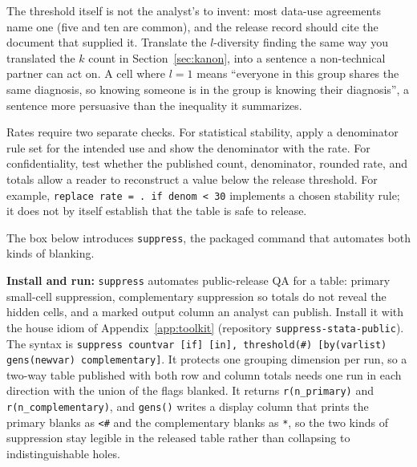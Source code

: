 The threshold itself is not the analyst's to invent: most data-use agreements name one (five and ten are common), and the release record should cite the document that supplied it. Translate the $l$-diversity finding the same way you translated the $k$ count in Section~\ref{sec:kanon}, into a sentence a non-technical partner can act on. A cell where $l=1$ means \enquote{everyone in this group shares the same diagnosis, so knowing someone is in the group is knowing their diagnosis}, a sentence more persuasive than the inequality it summarizes.

Rates require two separate checks. For statistical stability, apply a denominator rule set for the intended use and show the denominator with the rate. For confidentiality, test whether the published count, denominator, rounded rate, and totals allow a reader to reconstruct a value below the release threshold. For example, \texttt{replace rate = . if denom < 30} implements a chosen stability rule; it does not by itself establish that the table is safe to release.

The box below introduces \texttt{suppress}, the packaged command that automates both kinds of blanking.

\begin{kaobox}[frametitle=Package Integration: \texttt{suppress}]
\textbf{Install and run:} \texttt{suppress} automates public-release QA for a table: primary small-cell suppression, complementary suppression so totals do not reveal the hidden cells, and a marked output column an analyst can publish. Install it with the house idiom of Appendix~\ref{app:toolkit} (repository \texttt{suppress-stata-public}).
The syntax is \texttt{suppress countvar [if] [in], threshold(\#) [by(varlist) gens(newvar) complementary]}. It protects one grouping dimension per run, so a two-way table published with both row and column totals needs one run in each direction with the union of the flags blanked. It returns \texttt{r(n\_primary)} and \texttt{r(n\_complementary)}, and \texttt{gens()} writes a display column that prints the primary blanks as \texttt{<\#} and the complementary blanks as \texttt{*}, so the two kinds of suppression stay legible in the released table rather than collapsing to indistinguishable holes.
\end{kaobox}

